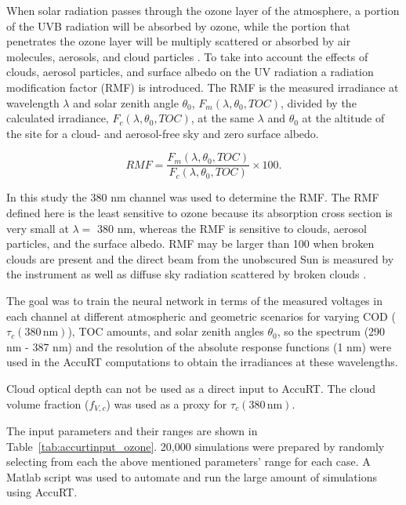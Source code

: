 \documentclass{optica-article}
\begin{document}
When solar radiation passes through the ozone layer of the atmosphere, a portion of the UVB radiation will be absorbed by ozone, while the portion that penetrates the ozone layer will be multiply scattered or absorbed by air molecules, aerosols, and cloud particles 
\cite{knutbook}. 
To take into account the effects of clouds, aerosol particles, and surface albedo on the UV radiation a radiation modification factor (RMF) is introduced. The RMF is the measured irradiance at wavelength $\lambda$ and solar zenith angle $\theta_0$, $F_m(\lambda,\theta_0,TOC)$, divided by the calculated irradiance, $F_c(\lambda,\theta_0,{ TOC})$, at the same $\lambda$ and $\theta_0$ at the altitude of the site for a cloud- and aerosol-free sky and zero surface albedo.

\begin{equation}
	\label{eq:CLT}
 		RMF =\frac{F_m(\lambda,\theta_0,{ TOC})}{F_c(\lambda,\theta_0,{ TOC})}\times 100.
\end{equation}

In this study the 380 nm channel was used to determine the RMF. 
The RMF defined here is the least sensitive to ozone because its absorption cross section is very small at $\lambda=$ 380 nm, whereas the RMF is sensitive to clouds, aerosol particles, and the surface albedo. 
RMF may be larger than 100 when broken clouds are present and the direct beam from the unobscured Sun is measured by the instrument as well as diffuse sky radiation scattered by broken clouds \cite{Dahlback:2003}. 

The goal was to train the neural network in terms of the measured voltages in each channel at different atmospheric and geometric scenarios for varying COD ($\tau_c{\scriptstyle(380 \, \text{nm})}$), TOC amounts, and solar zenith angles $\theta_0$, so the spectrum (290 nm - 387 nm) and the resolution of the absolute response functions (1 nm) were used in the AccuRT computations to obtain the irradiances at these wavelengths.

Cloud optical depth can not be used as a direct input to AccuRT. 
The cloud volume fraction ($f_{V,c}$) was used as a proxy for $\tau_c{\scriptstyle(380 \, \text{nm})}$. 

The input parameters and their ranges are shown in Table~\ref{tab:accurtinput_ozone}.
20,000 simulations were prepared by randomly selecting from each the above mentioned parameters' range for each case. 
A Matlab script was used to automate and run the large amount of simulations using AccuRT.
\end{document}
